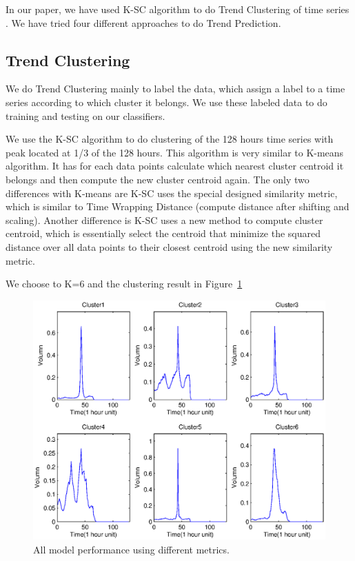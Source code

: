 \documentclass{article}
\begin{document}
In our paper, we have used K-SC algorithm to do Trend Clustering of time series \cite{Yang11}. We have tried four different approaches to do Trend Prediction.  

\subsection{Trend Clustering}

We do Trend Clustering mainly to label the data, which assign a label to a time series according to which cluster it belongs. We use these labeled data to do training and testing on our classifiers. 

We use the K-SC algorithm \cite{Yang11} to do clustering of the 128 hours time series with peak located at 1/3 of the 128 hours. This algorithm is very similar to K-means algorithm. It has for each data points calculate which nearest cluster centroid it belongs and then compute the new cluster centroid again. The only two differences with K-means are K-SC uses the special designed similarity metric, which is similar to Time Wrapping Distance (compute distance after shifting and scaling). Another difference is K-SC uses a new method to compute cluster centroid, which is essentially select the centroid that minimize the squared distance over all data points to their closest centroid using the new similarity metric.     

We choose to K=6 and the clustering result in Figure~\ref{six-cluster}

\begin{figure}[ht]
\vskip 0.2in
\begin{center}
\centerline{\includegraphics[width=\columnwidth]{sixClusters}}
\caption{All model performance using different metrics.}
\label{six-cluster}
\end{center}
\vskip -0.2in
\end{figure} 
\end{document}

